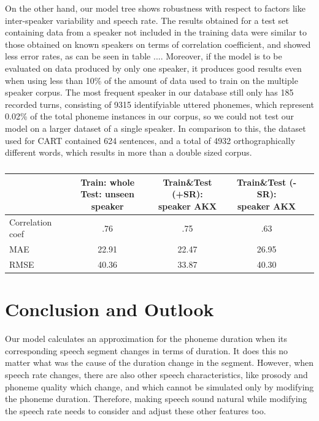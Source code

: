 \documentclass[a4paper]{scrreprt}
\begin{document}
On the other hand, our model tree shows robustness with respect to factors like inter-speaker variability and speech rate. The results obtained for a test set containing data from a speaker not included in the training data were similar to those obtained on known speakers on terms of correlation coefficient, and showed less error rates, as can be seen in table .... Moreover, if the model is to be evaluated on data produced by only one speaker, it produces good results even when using less than 10\% of the amount of data used to train on the multiple speaker corpus. The most frequent speaker in our database still only has 185 recorded turns, consisting of 9315 identifyiable uttered phonemes, which represent 0.02\% of the total phoneme instances in our corpus, so we could not test our model on a larger dataset of a single speaker. In comparison to this, the dataset used for CART contained 624 sentences, and a total of 4932 orthographically different words, which results in more than a double sized corpus.

\begin{table}[htbp]
\centering
\begin{tabular}{|l|c|c|c|c|}

\hline
	 & \shortstack{Train: whole \\ Test: unseen speaker} & \shortstack{Train\&Test (+SR): \\ speaker AKX} & \shortstack{Train\&Test (-SR): \\ speaker AKX} \\ 
\hline
\hline
Correlation coef 		& .76   & .75 & .63 \\
	\hline
MAE  &  22.91 & 22.47 & 26.95 \\
	\hline
RMSE  &  40.36 & 33.87 & 40.30 \\
	\hline

\end{tabular}
\caption{} 
\label{tab:perfM}
\end{table}

\chapter{Conclusion and Outlook}
Our model calculates an approximation for the phoneme duration when its corresponding speech segment changes in terms of duration. It does this no matter what was the cause of the duration change in the segment. However, when speech rate changes, there are also other speech characteristics, like prosody and phoneme quality which change, and which cannot be simulated only by modifying the phoneme duration. Therefore, making speech sound natural while modifying the speech rate needs to consider and adjust these other features too.
\end{document}
